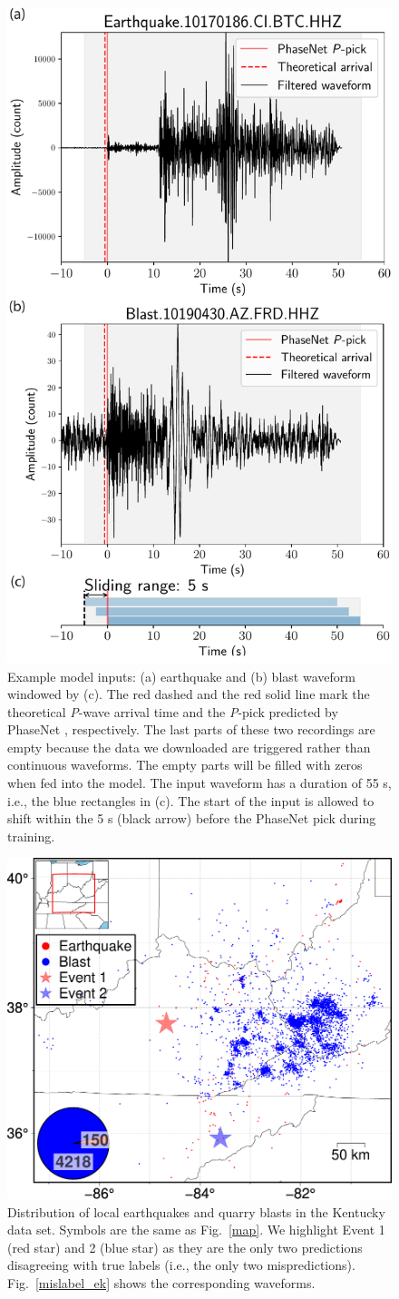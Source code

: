 \documentclass{gji}
\begin{document}
\begin{figure}
\centering
\includegraphics[width=.48\textwidth]{window.pdf}
\caption{Example model inputs: (a) earthquake and (b) blast waveform windowed by (c). The red dashed and the red solid line mark the theoretical \textit{P}-wave arrival time and the \textit{P}-pick predicted by PhaseNet \citep{phasenet}, respectively. The last parts of these two recordings are empty because the data we downloaded are triggered rather than continuous waveforms. The empty parts will be filled with zeros when fed into the model. The input waveform has a duration of 55 s, i.e., the blue rectangles in (c). The start of the input is allowed to shift within the 5 s (black arrow) before the PhaseNet pick during training.}
\label{phasenet}
\end{figure}

\begin{figure}
\centering
\includegraphics[width=.48\textwidth]{event_ek.pdf}
\caption{Distribution of local earthquakes and quarry blasts in the Kentucky data set. Symbols are the same as Fig.~\ref{map}. We highlight Event 1 (red star) and 2 (blue star) as they are the only two predictions disagreeing with true labels (i.e., the only two mispredictions). Fig.~\ref{mislabel_ek} shows the corresponding waveforms.}
\label{map_ek}
\end{figure}
\end{document}
